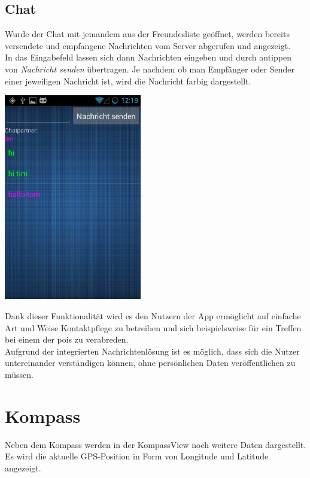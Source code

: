 \subsection{Chat}
Wurde der Chat mit jemandem aus der Freundesliste geöffnet, werden bereits versendete und empfangene Nachrichten vom Server abgerufen und angezeigt.\\
In das Eingabefeld lassen sich dann Nachrichten eingeben und durch antippen von \textit{Nachricht senden} übertragen. Je nachdem ob man Empfänger oder Sender einer jeweiligen Nachricht ist, wird die Nachricht farbig dargestellt.
\begin{capfigure}
	\includegraphics[width=6cm]{images/app/chat}
\end{capfigure}
Dank dieser Funktionalität wird es den Nutzern der App ermöglicht auf einfache Art und Weise Kontaktpflege zu betreiben und sich beispielsweise für ein Treffen bei einem der \glspl{poi} zu verabreden.\\
Aufgrund der integrierten Nachrichtenlösung ist es möglich, dass sich die Nutzer untereinander verständigen können, ohne persönlichen Daten veröffentlichen zu müssen.

\section{Kompass}
Neben dem Kompass werden in der KompassView noch weitere Daten dargestellt. Es wird die aktuelle GPS-Position in Form von Longitude und Latitude angezeigt.

